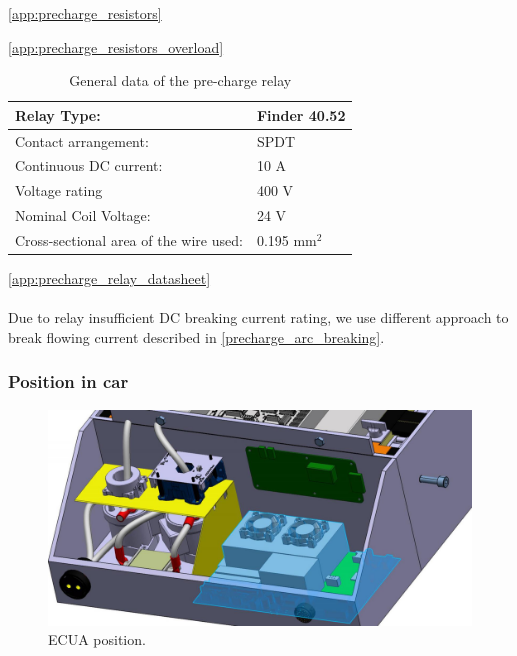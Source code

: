 \ref{app:precharge_resistors}

\ref{app:precharge_resistors_overload}


\begin{table}[H]
	\centering
	\caption{General data of the pre-charge relay}
	\begin{tabularx}{\textwidth}{|X|X|}
		\hline
		Relay Type: & Finder 40.52\\[\TableSize]
		\hline
		Contact arrangement: &  SPDT \\[\TableSize]
		\hline
		Continuous DC current:  & 10 A\\[\TableSize]
		\hline
		Voltage rating  & 400 V\\[\TableSize]
		\hline
		Nominal Coil Voltage: & 24 V \\[\TableSize]
		\hline
		Cross-sectional area of the wire used: & 0.195 mm$^2$ \\[\TableSize]
		\hline
	\end{tabularx}%
	\label{tab:precharge-relay}%
\end{table}%

\ref{app:precharge_relay_datasheet}
\\\\
Due to relay insufficient DC breaking current rating, we use different approach to break flowing current described in \ref{precharge_arc_breaking}.

\subsubsection{Position in car}

\begin{figure}[H]
	\centering
	\includegraphics[width=\textwidth]{./img/ECUA_POSITION.jpg}
	\caption{ECUA position.}
	\label{fig:ECUA}
\end{figure}